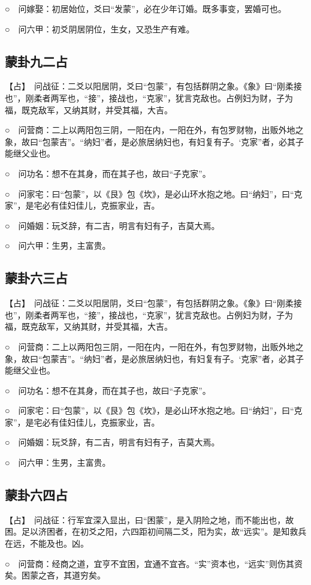 \documentclass[12pt,oneside]{book}
\begin{document}
○　问嫁娶：初居始位，爻曰“发蒙”，必在少年订婚。既多事变，罢婚可也。

○　问六甲：初爻阴居阴位，生女，又恐生产有难。

\subsection{蒙卦九二占}
【占】　问战征：二爻以阳居阴，爻曰“包蒙”，有包括群阴之象。《象》曰“刚柔接也”，刚柔者两军也，“接”，接战也，“克家”，犹言克敌也。占例妇为财，子为福，既克敌军，又纳其财，并受其福，大吉。

○　问营商：二上以两阳包三阴，一阳在内，一阳在外，有包罗财物，出贩外地之象，故曰“包蒙吉”。“纳妇”者，是必旅居纳妇也，有妇复有子。‘克家”者，必其子能继父业也。

○　问功名：想不在其身，而在其子也，故曰“子克家”。

○　问家宅：曰“包蒙”，以《艮》包《坎》，是必山环水抱之地。曰“纳妇”，曰“克家”，是宅必有佳妇佳儿，克振家业，吉。

○　问婚姻：玩爻辞，有二吉，明言有妇有子，吉莫大焉。

○　问六甲：生男，主富贵。

\subsection{蒙卦六三占}
【占】　问战征：二爻以阳居阴，爻曰“包蒙”，有包括群阴之象。《象》曰“刚柔接也”，刚柔者两军也，“接”，接战也，“克家”，犹言克敌也。占例妇为财，子为福，既克敌军，又纳其财，并受其福，大吉。

○　问营商：二上以两阳包三阴，一阳在内，一阳在外，有包罗财物，出贩外地之象，故曰“包蒙吉”。“纳妇”者，是必旅居纳妇也，有妇复有子。‘克家”者，必其子能继父业也。

○　问功名：想不在其身，而在其子也，故曰“子克家”。

○　问家宅：曰“包蒙”，以《艮》包《坎》，是必山环水抱之地。曰“纳妇”，曰“克家”，是宅必有佳妇佳儿，克振家业，吉。

○　问婚姻：玩爻辞，有二吉，明言有妇有子，吉莫大焉。

○　问六甲：生男，主富贵。

\subsection{蒙卦六四占}
【占】　问战征：行军宜深入显出，曰“困蒙”，是入阴险之地，而不能出也，故困。足以济困者，在初爻之阳，六四距初间隔二爻，阳为实，故“远实”。是知救兵在远，不能及也。凶。

○　问营商：经商之道，宜亨不宜困，宜通不宜吝。“实”资本也，“远实”则伤其资矣。困蒙之吝，其道穷矣。
\end{document}
